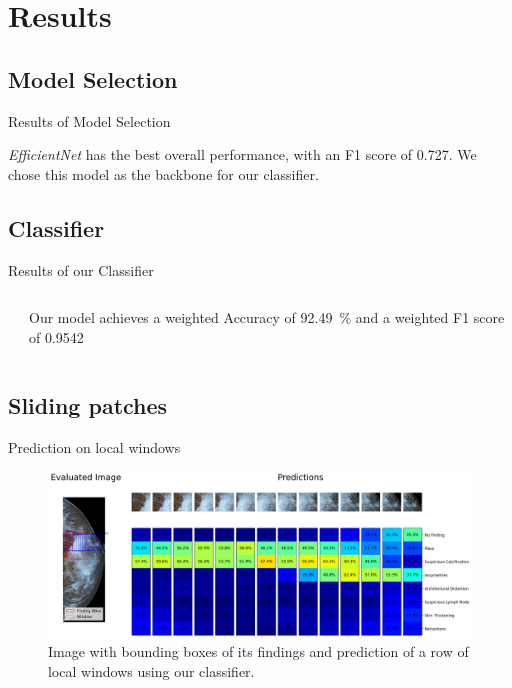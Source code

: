 \section{Results}
\subsection{Model Selection}

\begin{frame}{Results of Model Selection}
    

    \emph{EfficientNet} has the best overall performance, with an F1 score of \num{0.727}. We chose this model as the backbone for our classifier.
\end{frame}

\subsection{Classifier}
\begin{frame}{Results of our Classifier}
    \begin{columns}
        \begin{column}{0.65\textwidth}
            
        \end{column}
        \begin{column}{0.35\textwidth}
            Our model achieves a weighted Accuracy of \SI{92.49}{\percent} and a weighted F1 score of \num{0.9542}
        \end{column}
    \end{columns}
    
\end{frame}

\subsection{Sliding patches}
\begin{frame}{Prediction on local windows}
    \begin{figure}
        \centering
        \includegraphics[width=\textwidth]{imagenes/pred_ventanas.png}
        \caption{Image with bounding boxes of its findings and prediction of a row of local windows using our classifier.}
    \end{figure}
\end{frame}

